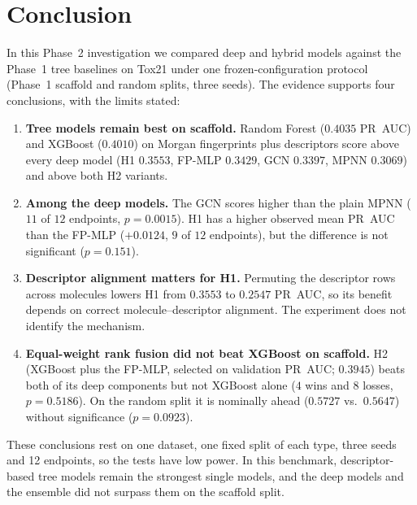 \section{Conclusion}
\label{sec:conclusion}

In this Phase~2 investigation we compared deep and hybrid models against the Phase~1 tree baselines on Tox21 under one frozen-configuration protocol (Phase~1 scaffold and random splits, three seeds). The evidence supports four conclusions, with the limits stated:
\begin{enumerate}
    \item \textbf{Tree models remain best on scaffold.} Random Forest ($0.4035$ PR~AUC) and XGBoost ($0.4010$) on Morgan fingerprints plus descriptors score above every deep model (H1 $0.3553$, FP-MLP $0.3429$, GCN $0.3397$, MPNN $0.3069$) and above both H2 variants.
    \item \textbf{Among the deep models.} The GCN scores higher than the plain MPNN ($11$ of $12$ endpoints, $p = 0.0015$). H1 has a higher observed mean PR~AUC than the FP-MLP ($+0.0124$, $9$ of $12$ endpoints), but the difference is not significant ($p = 0.151$).
    \item \textbf{Descriptor alignment matters for H1.} Permuting the descriptor rows across molecules lowers H1 from $0.3553$ to $0.2547$ PR~AUC, so its benefit depends on correct molecule--descriptor alignment. The experiment does not identify the mechanism.
    \item \textbf{Equal-weight rank fusion did not beat XGBoost on scaffold.} H2 (XGBoost plus the FP-MLP, selected on validation PR~AUC; $0.3945$) beats both of its deep components but not XGBoost alone ($4$ wins and $8$ losses, $p = 0.5186$). On the random split it is nominally ahead ($0.5727$ vs.\ $0.5647$) without significance ($p = 0.0923$).
\end{enumerate}

These conclusions rest on one dataset, one fixed split of each type, three seeds and 12 endpoints, so the tests have low power. In this benchmark, descriptor-based tree models remain the strongest single models, and the deep models and the ensemble did not surpass them on the scaffold split.
